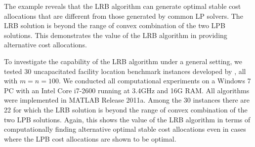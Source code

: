 The example reveals that the LRB algorithm can generate optimal stable cost allocations that are different from those generated by common LP solvers.
The LRB solution is beyond the range of convex combination of the two LPB solutions.
This demonstrates the value of the LRB algorithm in providing alternative cost allocations.


To investigate the capability of the LRB algorithm under a general setting, we tested 30 uncapacitated facility location benchmark instances developed by \cite{Benchmark}, all with $m=n=100$. We conducted all computational experiments  on a Windows 7 PC with an Intel Core i7-2600 running at 3.4GHz and 16G RAM. All algorithms were implemented in MATLAB Release 2011a.
Among the 30 instances there are 22 for which the LRB solution is  beyond the range of convex combination of the two LPB solutions.
Again, this shows the value of the LRB algorithm in terms of computationally finding alternative optimal stable cost allocations even in cases where the LPB cost allocations are shown to be optimal.
